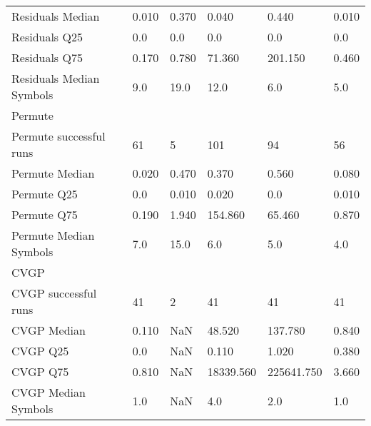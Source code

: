 \begin{tabular}{llllll}
Residuals Median & 0.010 & 0.370 & 0.040 & 0.440 & 0.010 \\
Residuals Q25 & 0.0 & 0.0 & 0.0 & 0.0 & 0.0 \\
Residuals Q75 & 0.170 & 0.780 & 71.360 & 201.150 & 0.460 \\
Residuals Median Symbols & 9.0 & 19.0 & 12.0 & 6.0 & 5.0 \\
Permute &   &   &   &   &   \\
Permute successful runs & 61 & 5 & 101 & 94 & 56 \\
Permute Median & 0.020 & 0.470 & 0.370 & 0.560 & 0.080 \\
Permute Q25 & 0.0 & 0.010 & 0.020 & 0.0 & 0.010 \\
Permute Q75 & 0.190 & 1.940 & 154.860 & 65.460 & 0.870 \\
Permute Median Symbols & 7.0 & 15.0 & 6.0 & 5.0 & 4.0 \\
CVGP &   &   &   &   &   \\
CVGP successful runs & 41 & 2 & 41 & 41 & 41 \\
CVGP Median & 0.110 & NaN & 48.520 & 137.780 & 0.840 \\
CVGP Q25 & 0.0 & NaN & 0.110 & 1.020 & 0.380 \\
CVGP Q75 & 0.810 & NaN & 18339.560 & 225641.750 & 3.660 \\
CVGP Median Symbols & 1.0 & NaN & 4.0 & 2.0 & 1.0 \\
\bottomrule
\end{tabular}
